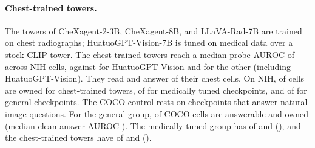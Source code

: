 \paragraph{Chest-trained towers.} The towers of CheXagent-2-3B, CheXagent-8B, and LLaVA-Rad-7B are trained on chest radiographs; HuatuoGPT-Vision-7B is tuned on medical data over a stock CLIP tower. The chest-trained towers reach a median probe AUROC of \cfSpecTowerProbeAuroc{} across \cfSpecTowerProbeN{} NIH cells, against \cfSpecStockProbeAuroc{} for HuatuoGPT-Vision and \cfSpecRestProbeAuroc{} for the other \cfSpecRestProbeN{} (including HuatuoGPT-Vision). They read \cfSpecTowerReadable{} and answer \cfSpecTowerAnswerable{} of their \cfSpecTowerN{} chest cells. On NIH, \cfSpecNihTowerOwned{} of \cfSpecNihTowerN{} cells are owned for chest-trained towers, \cfSpecNihMedOwned{} of \cfSpecNihMedN{} for medically tuned checkpoints, and \cfSpecNihGenOwned{} of \cfSpecNihGenN{} for general checkpoints. The COCO control rests on checkpoints that answer natural-image questions. For the general group, \cfSpecGenCocoAnswerable{} of \cfSpecGenCocoN{} COCO cells are answerable and \cfSpecGenCocoOwned{} owned (median clean-answer AUROC \cfSpecGenCocoAnsAuroc{}). The medically tuned group has \cfSpecMedCocoAnswerable{} of \cfSpecMedCocoN{} and \cfSpecMedCocoOwned{} (\cfSpecMedCocoAnsAuroc{}), and the chest-trained towers have \cfSpecTowerCocoAnswerable{} of \cfSpecTowerCocoN{} and \cfSpecTowerCocoOwned{} (\cfSpecTowerCocoAnsAuroc{}).

